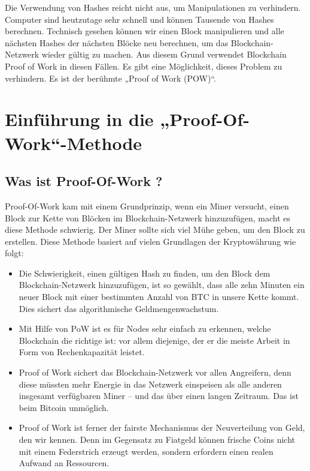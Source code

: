 \documentclass[ngerman]{scrreprt}
\begin{document}
Die Verwendung von Hashes reicht nicht aus, um Manipulationen zu verhindern. Computer sind heutzutage sehr schnell und können Tausende von Hashes berechnen. Technisch gesehen können wir einen Block manipulieren und alle nächsten Hashes der nächsten Blöcke neu berechnen, um das Blockchain-Netzwerk wieder gültig zu machen. Aus diesem Grund verwendet Blockchain Proof of Work
in diesen Fällen. Es gibt eine Möglichkeit, dieses Problem zu verhindern. Es ist der berühmte „Proof of Work (POW)“.	








\chapter[Theoretische Seite der Proof-Of-Work-Methode]{Einführung in die „Proof-Of-Work“-Methode}	

\section{Was ist Proof-Of-Work ?}
Proof-Of-Work kam mit einem Grundprinzip, wenn ein Miner versucht, einen Block zur Kette von Blöcken im Blockchain-Netzwerk hinzuzufügen, macht es diese Methode schwierig. Der Miner sollte sich viel Mühe geben, um den Block zu erstellen. Diese Methode basiert auf vielen Grundlagen der Kryptowährung wie folgt:

\begin{itemize}
	\item{Die Schwierigkeit, einen gültigen Hash zu finden, um den Block dem Blockchain-Netzwerk hinzuzufügen, ist so gewählt, dass alle zehn Minuten ein neuer Block mit einer bestimmten Anzahl von BTC in unsere Kette kommt.
		Dies sichert das algorithmische Geldmengenwachstum.}
	\item{Mit Hilfe von PoW ist es für Nodes sehr einfach zu erkennen, welche Blockchain die richtige ist: vor allem diejenige, der er die meiste Arbeit in Form von Rechenkapazität leistet.}
	\item{Proof of Work sichert das Blockchain-Netzwerk vor allen Angreifern, denn diese müssten mehr Energie in das Netzwerk einspeisen als alle anderen insgesamt verfügbaren Miner – und das über einen langen Zeitraum. Das ist beim Bitcoin unmöglich.}
	\item{Proof of Work ist ferner der fairste Mechanismus der Neuverteilung von Geld, den wir kennen. Denn im Gegensatz zu Fiatgeld können frische Coins nicht mit einem Federstrich erzeugt werden, sondern erfordern einen realen Aufwand an Ressourcen.}
\end{itemize}
\end{document}
